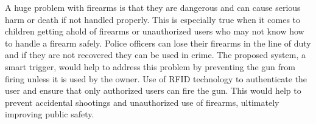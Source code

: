 

A huge problem with firearms is that they are dangerous and can cause serious harm or death if not handled properly.
This is especially true when it comes to children getting ahold of firearms or unauthorized users who may not know how to handle a firearm safely. Police officers can
lose their firearms in the line of duty and if they are not recovered they can be used in crime. The proposed system, a smart trigger,
would help to address this problem by preventing the gun from firing unless it is used by the owner. 
Use of RFID technology to authenticate the user and ensure that only authorized users can fire the gun. 
This would help to prevent accidental shootings and unauthorized use of firearms, ultimately improving public safety.
